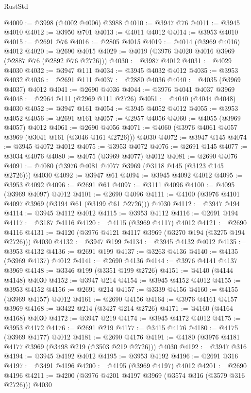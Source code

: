\begin{lexlean}{RustStd}
\begin{coremodule}
@4009 := @3998 (@4002 @4006) @3988
@4010 := @3947 @76
@4011 := @3945 @4010
@4012 := @3950 @701
@4013 := @4011 @4012
@4014 := @3953 @4010
@4015 := @2691 @76
@4016 := @2805 @4015
@4019 := @4014 (@3969 @4016) @4012
@4020 := @2690 @4015
@4029 := @4019 (@3976 @4020 @4016 @3969 (@2887 @76 (@2892 @76 @2726)))
@4030 := @3987 @4012
@4031 := @4029 @4030
@4032 := @3947 @111
@4034 := @3945 @4032 @4012
@4035 := @3953 @4032
@4036 := @2691 @111
@4037 := @2880 @4036
@4040 := @4035 (@3969 @4037) @4012
@4041 := @2690 @4036
@4044 := @3976 @4041 @4037 @3969
@4048 := @2964 @111 (@2969 @111 @2726)
@4051 := @4040 (@4044 @4048) @4030
@4052 := @3947 @161
@4054 := @3945 @4052 @4012
@4055 := @3953 @4052
@4056 := @2691 @161
@4057 := @2957 @4056
@4060 := @4055 (@3969 @4057) @4012
@4061 := @2690 @4056
@4071 := @4060 (@3976 @4061 @4057 @3969 (@3041 @161 (@3046 @161 @2726))) @4030
@4072 := @3947 @145
@4074 := @3945 @4072 @4012
@4075 := @3953 @4072
@4076 := @2691 @145
@4077 := @3034 @4076
@4080 := @4075 (@3969 @4077) @4012
@4081 := @2690 @4076
@4091 := @4080 (@3976 @4081 @4077 @3969 (@3118 @145 (@3123 @145 @2726))) @4030
@4092 := @3947 @61
@4094 := @3945 @4092 @4012
@4095 := @3953 @4092
@4096 := @2691 @61
@4097 := @3111 @4096
@4100 := @4095 (@3969 @4097) @4012
@4101 := @2690 @4096
@4111 := @4100 (@3976 @4101 @4097 @3969 (@3194 @61 (@3199 @61 @2726))) @4030
@4112 := @3947 @194
@4114 := @3945 @4112 @4012
@4115 := @3953 @4112
@4116 := @2691 @194
@4117 := @3187 @4116
@4120 := @4115 (@3969 @4117) @4012
@4121 := @2690 @4116
@4131 := @4120 (@3976 @4121 @4117 @3969 (@3270 @194 (@3275 @194 @2726))) @4030
@4132 := @3947 @199
@4134 := @3945 @4132 @4012
@4135 := @3953 @4132
@4136 := @2691 @199
@4137 := @3263 @4136
@4140 := @4135 (@3969 @4137) @4012
@4141 := @2690 @4136
@4144 := @3976 @4141 @4137 @3969
@4148 := @3346 @199 (@3351 @199 @2726)
@4151 := @4140 (@4144 @4148) @4030
@4152 := @3947 @214
@4154 := @3945 @4152 @4012
@4155 := @3953 @4152
@4156 := @2691 @214
@4157 := @3339 @4156
@4160 := @4155 (@3969 @4157) @4012
@4161 := @2690 @4156
@4164 := @3976 @4161 @4157 @3969
@4168 := @3422 @214 (@3427 @214 @2726)
@4171 := @4160 (@4164 @4168) @4030
@4172 := @3947 @219
@4174 := @3945 @4172 @4012
@4175 := @3953 @4172
@4176 := @2691 @219
@4177 := @3415 @4176
@4180 := @4175 (@3969 @4177) @4012
@4181 := @2690 @4176
@4191 := @4180 (@3976 @4181 @4177 @3969 (@3498 @219 (@3503 @219 @2726))) @4030
@4192 := @3947 @316
@4194 := @3945 @4192 @4012
@4195 := @3953 @4192
@4196 := @2691 @316
@4197 := @3491 @4196
@4200 := @4195 (@3969 @4197) @4012
@4201 := @2690 @4196
@4211 := @4200 (@3976 @4201 @4197 @3969 (@3574 @316 (@3579 @316 @2726))) @4030

\end{coremodule}
\end{lexlean}
